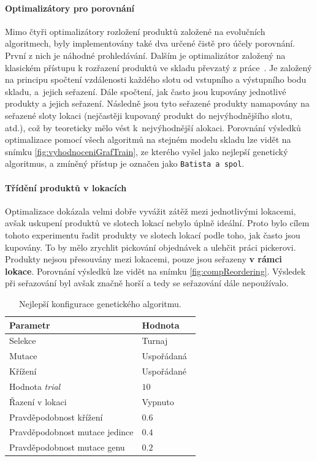 \paragraph{Optimalizátory pro porovnání}
Mimo čtyři optimalizátory rozložení produktů založené na evolučních algoritmech, byly implementovány také dva  určené čistě pro účely porovnání. První z nich je náhodné prohledávání. Dalším je optimalizátor založený na klasickém přístupu k rozřazení produktů ve skladu převzatý z práce~\cite{slapSeacomp}. Je založený na principu spočtení vzdálenosti každého slotu od vstupního a výstupního bodu skladu, a~jejich seřazení. Dále spočtení, jak často jsou kupovány jednotlivé produkty a jejich seřazení. Následně jsou tyto seřazené produkty namapovány na seřazené sloty lokaci (nejčastěji kupovaný produkt do nejvýhodnějšího slotu, atd.), což by teoreticky mělo vést k~nejvýhodnější alokaci. Porovnání výsledků optimalizace pomocí všech algoritmů na stejném modelu skladu lze vidět na snímku \ref{fig:vyhodnoceniGrafTrain}, ze kterého vyšel jako nejlepší genetický algoritmus, a zmíněný přístup je označen jako \texttt{Batista a spol}.

\paragraph{Třídění produktů v lokacích}
Optimalizace dokázala velmi dobře vyvážit zátěž mezi jednotlivými lokacemi, avšak uskupení produktů ve slotech lokací nebylo úplně ideální. Proto bylo cílem tohoto experimentu řadit produkty ve slotech lokací podle toho, jak často jsou kupovány. To by mělo zrychlit pickování objednávek a ulehčit práci pickerovi. Produkty nejsou přesouvány mezi lokacemi, pouze jsou seřazeny \textbf{v rámci lokace}. Porovnání výsledků lze vidět na snímku \ref{fig:compReordering}. Výsledek při seřazování byl avšak značně horší a tedy se seřazování dále nepoužívalo.

\begin{table}[t]
	\vskip6pt
	\caption{Nejlepší konfigurace genetického algoritmu.}
	\centering
	\begin{tabular}{ll}
		\toprule
		\textbf{Parametr} & \textbf{Hodnota}\\
		\midrule
		Selekce     & Turnaj           \\
		Mutace      & Uspořádaná~\cite{orderedCrossover} \\
		Křížení     & Uspořádané~\cite{orderedCrossover} \\
		Hodnota \emph{trial} & $10$    \\
		Řazení v lokaci      & Vypnuto \\
		Pravděpodobnost křížení         & $0.6$ \\
		Pravděpodobnost mutace jedince  & $0.4$ \\
		Pravděpodobnost mutace genu     & $0.2$ \\
		\bottomrule
	\end{tabular}
	\label{tab:nejConfig}
\end{table}


